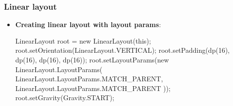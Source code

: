 \documentclass{report}
\begin{document}
    \pagebreak 
    \subsubsection{Linear layout}
    \begin{itemize}
        \item \textbf{Creating linear layout with layout params}:
            \bigbreak \noindent 
            \begin{javacode}
                LinearLayout root = new LinearLayout(this);
                root.setOrientation(LinearLayout.VERTICAL);
                root.setPadding(dp(16), dp(16), dp(16), dp(16));
                root.setLayoutParams(new LinearLayout.LayoutParams(
                        LinearLayout.LayoutParams.MATCH_PARENT,
                        LinearLayout.LayoutParams.MATCH_PARENT
                ));
                root.setGravity(Gravity.START);
            \end{javacode}
    \end{itemize}

    \pagebreak 
\end{document}
